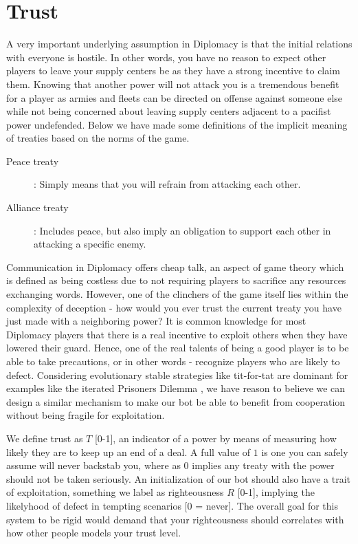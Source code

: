 \documentclass[a4paper]{article} %
\begin{document}
\section{Trust}


A very important underlying assumption in Diplomacy is that the initial relations with everyone is hostile. In other words, you have no reason to expect other players to leave your supply centers be as they have a strong incentive to claim them. Knowing that another power will not attack you is a tremendous benefit for a player as armies and fleets can be directed on offense against someone else while not being concerned about leaving supply centers adjacent to a pacifist power undefended. Below we have made some definitions of the implicit meaning of treaties based on the norms of the game.
\begin{description}
\item[Peace treaty]: Simply means that you will refrain from attacking each other.

\item[Alliance treaty]: Includes peace, but also imply an obligation to support each other in attacking a specific enemy.
\end{description}

Communication in Diplomacy offers cheap talk, an aspect of game theory which is defined as being costless due to not requiring players to sacrifice any resources exchanging words. However, one of the clinchers of the game itself lies within the complexity of deception - how would you ever trust the current treaty you have just made with a neighboring power? It is common knowledge for most Diplomacy players that there is a real incentive to exploit others when they have lowered their guard. Hence, one of the real talents of being a good player is to be able to take precautions, or in other words - recognize players who are likely to defect. Considering evolutionary stable strategies like tit-for-tat are dominant for examples like the iterated Prisoners Dilemma \cite{dilemmas}, we have reason to believe we can design a similar mechanism to make our bot be able to benefit from cooperation without being fragile for exploitation.

We define trust as $T$ [0-1], an indicator of a power by means of measuring how likely they are to keep up an end of a deal. A full value of $1$ is one you can safely assume will never backstab you, where as $0$ implies any treaty with the power should not be taken seriously. An initialization of our bot should also have a trait of exploitation, something we label as righteousness $R$ [0-1], implying the likelyhood of defect in tempting scenarios [0 = never]. The overall goal for this system to be rigid would demand that your righteousness should correlates with how other people models your trust level. 
\end{document}
